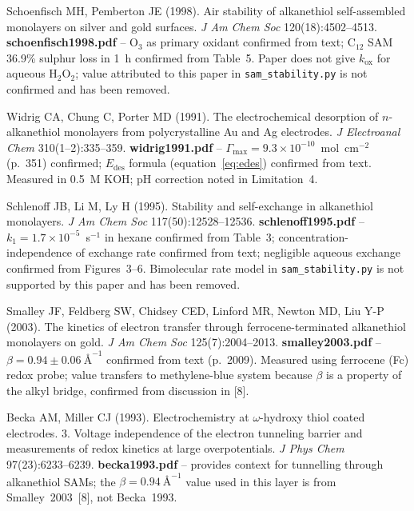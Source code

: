 \documentclass[10pt,a4paper]{article}
\numberwithin{equation}{section}
\newcommand{\cit}[1]{[#1]}   %
\newcommand{\As}{\text{\AA}^{-1}}
\begin{document}
\begin{enumerate}[label={[\arabic*]},noitemsep,leftmargin=*]
\item Schoenfisch MH, Pemberton JE (1998). Air stability of alkanethiol self-assembled
  monolayers on silver and gold surfaces.
  \textit{J Am Chem Soc} 120(18):4502--4513.
  \textbf{schoenfisch1998.pdf} -- O$_3$ as primary oxidant confirmed from text; C$_{12}$
  SAM 36.9\% sulphur loss in 1~h confirmed from Table~5. Paper does not give $k_{\mathrm{ox}}$
  for aqueous H$_2$O$_2$; value attributed to this paper in \texttt{sam\_stability.py} is not
  confirmed and has been removed.

\item Widrig CA, Chung C, Porter MD (1991). The electrochemical desorption of
  $n$-alkanethiol monolayers from polycrystalline Au and Ag electrodes.
  \textit{J Electroanal Chem} 310(1--2):335--359.
  \textbf{widrig1991.pdf} -- $\Gamma_{\max} = 9.3 \times 10^{-10}$~mol~cm$^{-2}$
  (p.~351) confirmed; $E_{\mathrm{des}}$ formula (equation~\ref{eq:edes}) confirmed from
  text. Measured in 0.5~M KOH; pH correction noted in Limitation~4.

\item Schlenoff JB, Li M, Ly H (1995). Stability and self-exchange in alkanethiol
  monolayers.
  \textit{J Am Chem Soc} 117(50):12528--12536.
  \textbf{schlenoff1995.pdf} -- $k_1 = 1.7 \times 10^{-5}$~s$^{-1}$ in hexane confirmed
  from Table~3; concentration-independence of exchange rate confirmed from text; negligible
  aqueous exchange confirmed from Figures~3--6. Bimolecular rate model in
  \texttt{sam\_stability.py} is not supported by this paper and has been removed.

\item Smalley JF, Feldberg SW, Chidsey CED, Linford MR, Newton MD, Liu Y-P (2003). The
  kinetics of electron transfer through ferrocene-terminated alkanethiol monolayers on gold.
  \textit{J Am Chem Soc} 125(7):2004--2013.
  \textbf{smalley2003.pdf} -- $\beta = 0.94 \pm 0.06\ \As$ confirmed from text (p.~2009).
  Measured using ferrocene (Fc) redox probe; value transfers to methylene-blue system because
  $\beta$ is a property of the alkyl bridge, confirmed from discussion in \cit{8}.

\item Becka AM, Miller CJ (1993). Electrochemistry at $\omega$-hydroxy thiol coated
  electrodes. 3. Voltage independence of the electron tunneling barrier and measurements
  of redox kinetics at large overpotentials.
  \textit{J Phys Chem} 97(23):6233--6239.
  \textbf{becka1993.pdf} -- provides context for tunnelling through alkanethiol SAMs;
  the $\beta = 0.94\ \As$ value used in this layer is from Smalley~2003~\cit{8}, not
  Becka~1993.


\end{enumerate}
\end{document}
